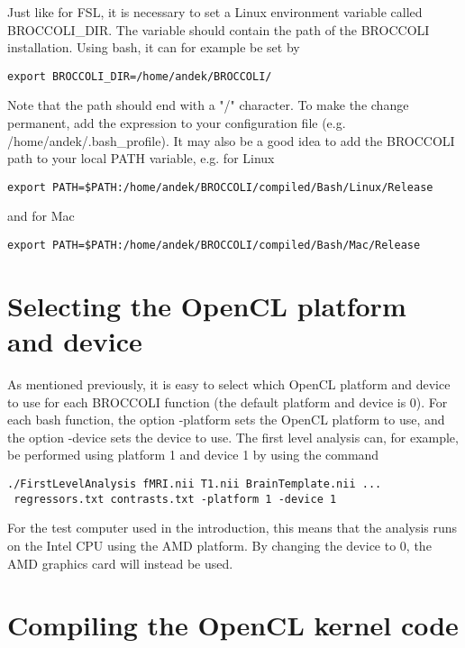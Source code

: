 Just like for FSL, it is necessary to set a Linux environment variable called BROCCOLI\_DIR. The variable should contain the path of the BROCCOLI installation. Using bash, it can for example be set by

\begin{verbatim}
export BROCCOLI_DIR=/home/andek/BROCCOLI/
\end{verbatim}

Note that the path should end with a "/" character. To make the change permanent, add the expression to your configuration file (e.g. /home/andek/.bash\_profile). It may also be a good idea to add the BROCCOLI path to your local PATH variable, e.g. for Linux

\begin{verbatim}
export PATH=$PATH:/home/andek/BROCCOLI/compiled/Bash/Linux/Release
\end{verbatim}

and for Mac

\begin{verbatim}
export PATH=$PATH:/home/andek/BROCCOLI/compiled/Bash/Mac/Release
\end{verbatim}


\section{Selecting the OpenCL platform and device}

As mentioned previously, it is easy to select which OpenCL platform and device to use for each BROCCOLI function (the default platform and device is 0). For each bash function, the option -platform sets the OpenCL platform to use, and the option -device sets the device to use. The first level analysis can, for example, be performed using platform 1 and device 1 by using the command

\begin{verbatim}
./FirstLevelAnalysis fMRI.nii T1.nii BrainTemplate.nii ...
 regressors.txt contrasts.txt -platform 1 -device 1
\end{verbatim}
	
For the test computer used in the introduction, this means that the analysis runs on the Intel CPU using the AMD platform. By changing the device to 0, the AMD graphics card will instead be used. 

\section{Compiling the OpenCL kernel code}

